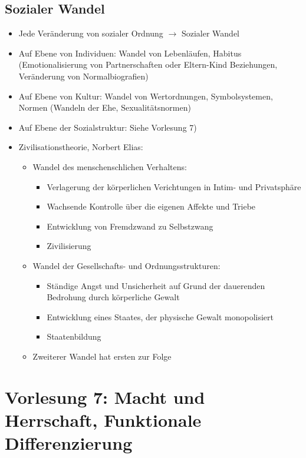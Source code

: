 \documentclass{scrartcl}
\begin{document}
\subsection*{Sozialer Wandel}
\begin{itemize}
    \item
	Jede Veränderung von sozialer Ordnung $\rightarrow$ Sozialer Wandel
    \item
	Auf Ebene von Individuen: Wandel von Lebenläufen, Habitus (Emotionalisierung von Partnerschaften oder Eltern-Kind Beziehungen, Veränderung von Normalbiografien)
    \item
	Auf Ebene von Kultur: Wandel von Wertordnungen, Symbolsystemen, Normen (Wandeln der Ehe, Sexualitätsnormen)
    \item
	Auf Ebene der Sozialstruktur: Siehe Vorlesung 7)
    \item
	Zivilisationstheorie, Norbert Elias:
	\begin{itemize}
	    \item
		Wandel des menschenschlichen Verhaltens:
		\begin{itemize}
		    \item
			Verlagerung der körperlichen Verichtungen in Intim- und Privatsphäre
		    \item
			Wachsende Kontrolle über die eigenen Affekte und Triebe
		    \item
			Entwicklung von Fremdzwand zu Selbstzwang
		    \item
			Zivilisierung
		\end{itemize}
	    \item
		Wandel der Gesellschafts- und Ordnungsstrukturen:
		\begin{itemize}
		    \item
			Ständige Angst und Unsicherheit auf Grund der dauerenden Bedrohung durch körperliche Gewalt
		    \item
			Entwicklung eines Staates, der physische Gewalt monopolisiert
		    \item
			Staatenbildung
		\end{itemize}
	    \item
		Zweiterer Wandel hat ersten zur Folge

	\end{itemize}
\end{itemize}
\section*{Vorlesung 7: Macht und Herrschaft, Funktionale Differenzierung}
\end{document}
